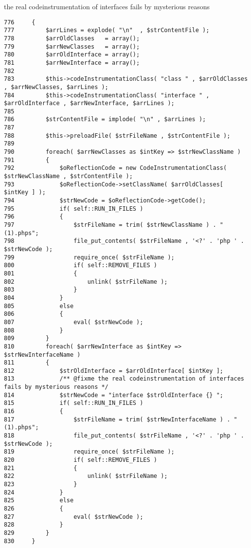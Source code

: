 the real codeinstrumentation of interfaces fails by mysterious reasons 

\begin{Code}\begin{verbatim}776     {
777         $arrLines = explode( "\n"  , $strContentFile );
778         $arrOldClasses   = array();
779         $arrNewClasses   = array();
780         $arrOldInterface = array();
781         $arrNewInterface = array();
782 
783         $this->codeInstrumentationClass( "class " , $arrOldClasses , $arrNewClasses, $arrLines );
784         $this->codeInstrumentationClass( "interface " , $arrOldInterface , $arrNewInterface, $arrLines );
785 
786         $strContentFile = implode( "\n" , $arrLines );
787 
788         $this->preloadFile( $strFileName , $strContentFile );
789 
790         foreach( $arrNewClasses as $intKey => $strNewClassName )
791         {
792             $oReflectionCode = new CodeInstrumentationClass( $strNewClassName , $strContentFile );
793             $oReflectionCode->setClassName( $arrOldClasses[ $intKey ] );
794             $strNewCode = $oReflectionCode->getCode();
795             if( self::RUN_IN_FILES )
796             {
797                 $strFileName = trim( $strNewClassName ) . "(1).phps";
798                 file_put_contents( $strFileName , '<?' . 'php ' .  $strNewCode );
799                 require_once( $strFileName );
800                 if( self::REMOVE_FILES )
801                 {
802                     unlink( $strFileName );
803                 }
804             }
805             else
806             {
807                 eval( $strNewCode );
808             }
809         }
810         foreach( $arrNewInterface as $intKey => $strNewInterfaceName )
811         {
812             $strOldInterface = $arrOldInterface[ $intKey ];
813             /** @fixme the real codeinstrumentation of interfaces fails by mysterious reasons */
814             $strNewCode = "interface $strOldInterface {} ";
815             if( self::RUN_IN_FILES )
816             {
817                 $strFileName = trim( $strNewInterfaceName ) . "(1).phps";
818                 file_put_contents( $strFileName , '<?' . 'php ' .  $strNewCode );
819                 require_once( $strFileName );
820                 if( self::REMOVE_FILES )
821                 {
822                     unlink( $strFileName );
823                 }
824             }
825             else
826             {
827                 eval( $strNewCode );
828             }
829         }
830     }
\end{verbatim}
\end{Code}


